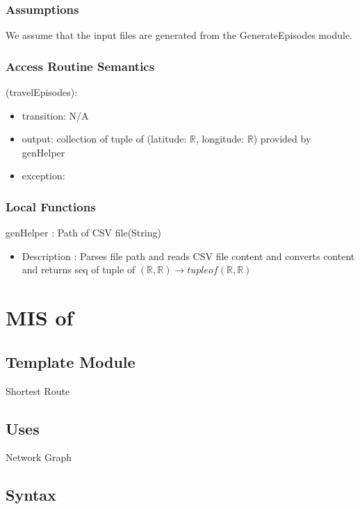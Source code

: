 \documentclass[12pt, titlepage]{article}
\begin{document}
\subsubsection{Assumptions}
We assume that the input files are generated from the GenerateEpisodes module.

\subsubsection{Access Routine Semantics}


\noindent {}(travelEpisodes):
\begin{itemize}
\item transition: N/A
\item output: collection of tuple of (latitude: $\mathbb{R}$, longitude: $\mathbb{R}$) provided by genHelper
\item exception:  
\end{itemize}


\subsubsection{Local Functions}


genHelper : Path of CSV file(String)
\begin{itemize}
    \item Description : Parses file path and reads CSV file content and converts content and returns seq of tuple of $(\mathbb{R}, \mathbb{R})  \rightarrow tuple of (\mathbb{R}, \mathbb{R})$
\end{itemize}


  
\newpage

\section{MIS of } \label{ModuleSPath} 

\subsection{Template Module}
Shortest Route

\subsection{Uses}%
Network Graph

\subsection{Syntax}
\end{document}
